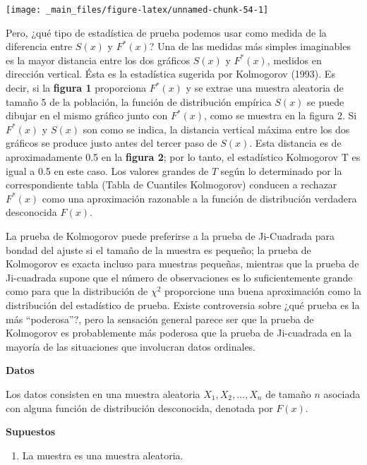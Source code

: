 \documentclass[
  a4paper,
  oneside,
  openany]{book}
\providecommand{\tightlist}{%
  \setlength{\itemsep}{0pt}\setlength{\parskip}{0pt}}
\begin{document}
\begin{center}\texttt{[image: \_main\_files/figure-latex/unnamed-chunk-54-1]} \end{center}

Pero, ¿qué tipo de estadística de prueba podemos usar como medida de la diferencia entre \(S(x)\) y \(F^* (x)\)? Una de las medidas más simples imaginables es la mayor distancia entre los dos gráficos \(S(x)\) y \(F^*(x)\), medidos en dirección vertical. Ésta es la estadística sugerida por Kolmogorov (1993).
Es decir, si la \textbf{figura 1} proporciona \(F^*(x)\) y se extrae una muestra aleatoria de tamaño 5 de la población, la función de distribución empírica \(S(x)\) se puede dibujar en el mismo gráfico junto con \(F^ *(x)\), como se muestra en la figura 2.
Si \(F^*(x)\) y \(S(x)\) son como se indica, la distancia vertical máxima entre los dos gráficos se produce justo antes del tercer paso de \(S(x)\).
Esta distancia es de aproximadamente 0.5 en la \textbf{figura 2}; por lo tanto, el estadístico Kolmogorov T es igual a 0.5 en este caso.
Los valores grandes de \(T\) según lo determinado por la correspondiente tabla (Tabla de Cuantiles Kolmogorov) conducen a rechazar \(F^*(x)\) como una aproximación razonable a la función de distribución verdadera desconocida \(F(x)\).

La prueba de Kolmogorov puede preferirse a la prueba de Ji-Cuadrada para bondad del ajuste si el tamaño de la muestra es pequeño; la prueba de Kolmogorov es exacta incluso para muestras pequeñas, mientras que la prueba de Ji-cuadrada supone que el número de observaciones es lo suficientemente grande como para que la distribución de \(\chi^2\) proporcione una buena aproximación como la distribución del estadístico de prueba. Existe controversia sobre ¿qué prueba es la más ``poderosa''?, pero la sensación general parece ser que la prueba de Kolmogorov es probablemente más poderosa que la prueba de Ji-cuadrada en la mayoría de las situaciones que involucran datos ordinales.

\textbf{Datos}

Los datos consisten en una muestra aleatoria \(X_{1},X_{2},\ldots,X_{n}\) de tamaño \(n\) asociada con alguna función de distribución desconocida, denotada por \(F(x)\).

\textbf{Supuestos}

\begin{enumerate}
\def\labelenumi{\arabic{enumi})}
\tightlist
\item
  La muestra es una muestra aleatoria.
\end{enumerate}
\end{document}
